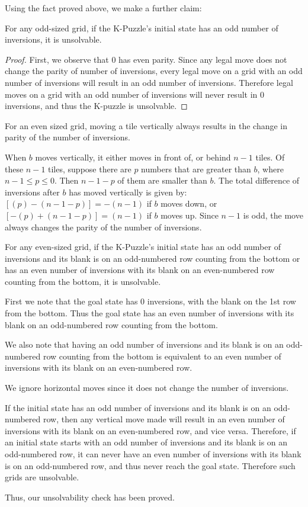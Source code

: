 \documentclass{llncs}
\begin{document}
Using the fact proved above, we make a further claim:
\begin{claim}
For any odd-sized grid, if the K-Puzzle’s initial state has an odd number of inversions, it is unsolvable.
\end{claim}
\begin{proof} 
First, we observe that 0 has even parity. Since any legal move does not change the parity of number of inversions, every legal move on a grid with an odd number of inversions will result in an odd number of inversions. Therefore legal moves on a grid with an odd number of inversions will never result in 0 inversions, and thus the K-puzzle is unsolvable. 
\end{proof}
\begin{claim}
For an even sized grid, moving a tile vertically always results in the change in parity of the number of inversions.
\end{claim}
When $b$ moves vertically, it either moves in front of, or behind $n-1$ tiles.
Of these $n-1$ tiles, suppose there are $p$ numbers that are greater than $b$, where $n-1 \leq p \leq 0$. Then $n-1-p$ of them are smaller than $b$. The total difference of inversions after $b$ has moved vertically is given by:
$[(p)-(n-1-p)]= -(n-1)$ if $b$ moves down, or  $[-(p) +(n-1-p)]= (n-1)$ if $b$ moves up. Since $n-1$ is odd, the move always changes the parity of the number of inversions.
\begin{claim}
For any even-sized grid, if the K-Puzzle’s initial state has an odd number of inversions and its blank is on an odd-numbered row counting from the bottom or has an even number of inversions with its blank on an even-numbered row counting from the bottom, it is unsolvable.
\end{claim}
First we note that the goal state has 0 inversions, with the blank on the 1st row from the bottom. Thus the goal state has an even number of inversions with its blank on an odd-numbered row counting from the bottom.

We also note that having an odd number of inversions and its blank is on an odd-numbered row counting from the bottom is equivalent to  an even number of inversions with its blank on an even-numbered row.

We ignore horizontal moves since it does not change the number of inversions.

If the initial state has an odd number of inversions and its blank is on an odd-numbered row, then any vertical move made will result in an even number of inversions with its blank on an even-numbered row, and vice versa. Therefore, if an initial state starts with an odd number of inversions and its blank is on an odd-numbered row, it can never have an even number of inversions with its blank is on an odd-numbered row, and thus never reach the goal state. Therefore such grids are unsolvable. 

Thus, our unsolvability check has been proved.
\end{document}
